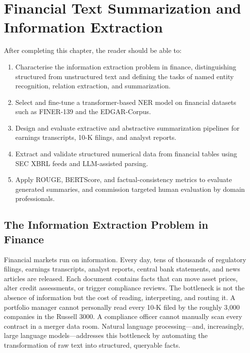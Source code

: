 \chapter{Financial Text Summarization and Information Extraction}
\label{ch:financial-text-summarization}

\begin{remark}
After completing this chapter, the reader should be able to:
\begin{enumerate}
  \item Characterise the information extraction problem in finance, distinguishing
        structured from unstructured text and defining the tasks of named entity
        recognition, relation extraction, and summarization.
  \item Select and fine-tune a transformer-based NER model on financial datasets such
        as FINER-139 and the EDGAR-Corpus.
  \item Design and evaluate extractive and abstractive summarization pipelines for
        earnings transcripts, 10-K filings, and analyst reports.
  \item Extract and validate structured numerical data from financial tables using
        SEC XBRL feeds and LLM-assisted parsing.
  \item Apply ROUGE, BERTScore, and factual-consistency metrics to evaluate generated
        summaries, and commission targeted human evaluation by domain professionals.
\end{enumerate}
\end{remark}

\section{The Information Extraction Problem in Finance}
\label{sec:ch14-information-extraction-problem}

Financial markets run on information. Every day, tens of thousands of regulatory
filings, earnings transcripts, analyst reports, central bank statements, and news
articles are released. Each document contains facts that can move asset prices, alter
credit assessments, or trigger compliance reviews. The bottleneck is not the
absence of information but the cost of reading, interpreting, and routing it. A
portfolio manager cannot personally read every 10-K filed by the roughly 3,000 companies
in the Russell 3000. A compliance officer cannot manually scan every contract in a
merger data room. Natural language processing---and, increasingly, large language
models---addresses this bottleneck by automating the transformation of raw text into
structured, queryable facts.

